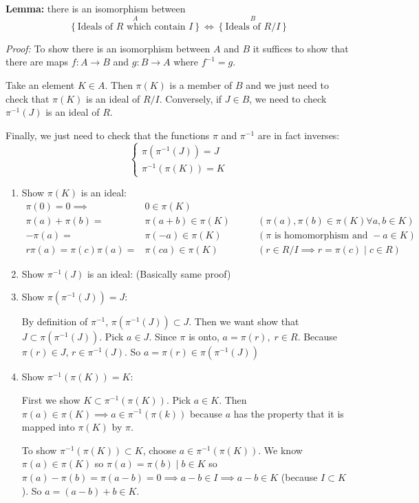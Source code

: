 \documentclass[12pt]{report}
\begin{document}
\textbf{Lemma:} there is an isomorphism between 
\[\overset{A}{\left\{\text{Ideals of $R$ which contain $I$}\right\}} \iff \overset{B}{\left\{\text{Ideals of $R/I$}\right\}}\]

\emph{Proof:} To show there is an isomorphism between $A$ and $B$ it suffices to show that there are maps $f: A \to B$ and $g: B \to A$ where $f^{-1} = g$. 

Take an element $K \in A$. Then $\pi(K)$ is a member of $B$ and we just need to check that $\pi(K)$ is an ideal of $R/I$. Conversely, if $J \in B$, we need to check $\pi^{-1}(J)$ is an ideal of $R$. 

Finally, we just need to check that the functions $\pi$ and $\pi^{-1}$ are in fact inverses:
\[\begin{cases}
    \pi(\pi^{-1}(J)) = J\\
    \pi^{-1}(\pi(K)) = K
\end{cases}\]

\begin{enumerate}
    \item Show $\pi(K)$ is an ideal:
        \begin{align*}
            \pi(0) = 0 \implies &0 \in \pi(K) & \\
            \pi(a) + \pi(b) = &\pi(a + b) \in \pi(K)& \qquad (\pi(a), \pi(b) \in \pi(K) \forall a, b \in K)\\
            -\pi(a) = &\pi(-a) \in \pi(K) &\qquad (\pi \text{ is homomorphism and }  -a \in K)\\
            r\pi(a) = \pi(c)\pi(a) = &\pi(ca) \in \pi(K) &\qquad (r \in R/I \implies r = \pi(c) \; | \; c \in R)
        \end{align*}
    \item Show $\pi^{-1}(J)$ is an ideal: (Basically same proof)
    
    \item Show $\pi(\pi^{-1}(J)) = J$:
        
        By definition of $\pi^{-1}$, $\pi(\pi^{-1}(J)) \subset J$. Then we want show that $J \subset \pi(\pi^{-1}(J))$. Pick $a \in J$. Since $\pi$ is onto, $a = \pi(r), \; r \in R$. Because $\pi(r) \in J$, $r \in \pi^{-1}(J)$. So $a = \pi(r) \in \pi(\pi^{-1}(J))$

    \item Show $\pi^{-1}(\pi(K)) = K$: 
    
        First we show $K \subset \pi^{-1}(\pi(K))$. Pick $a \in K$. Then $\pi(a) \in \pi(K) \implies a \in \pi^{-1}(\pi(k))$ because $a$ has the property that it is mapped into $\pi(K)$ by $\pi$.

        To show $\pi^{-1}(\pi(K)) \subset K$, choose $a \in \pi^{-1}(\pi(K))$. We know $\pi(a) \in \pi(K)$ so $\pi(a) = \pi(b) \; | \; b \in K$ so $\pi(a) - \pi(b) = \pi(a - b) = 0 \implies a - b \in I \implies a -b \in K$ (because $I \subset K$). So $a = (a - b) + b \in K$. 
\end{enumerate}
\end{document}
